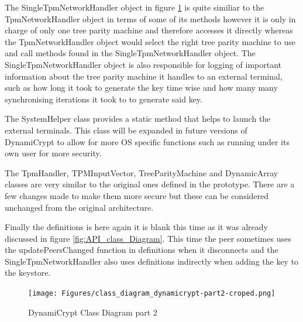 The SingleTpmNetworkHandler object in figure \ref{fig:class_diagram_dynamicrypt-part2} is quite similiar to the TpmNetworkHandler object in terms of some of its methods however it is only in charge of only one tree parity machine and therefore accesses it directly whereas the TpmNetworkHandler object would select the right tree parity machine to use and call methods found in the SingleTpmNetworkHandler object. The SingleTpmNetworkHandler object is also responsible for logging of important information about the tree parity machine it handles to an external terminal, such as how long it took to generate the key time wise and how many many synchronising iterations it took to to generate said key. 

The SystemHelper class provides a static method that helps to launch the external terminals. This class will be expanded in future versions of DynamiCrypt to allow for more OS specific functions such as running under its own user for more security. 

The TpmHandler, TPMInputVector, TreeParityMachine and DynamicArray classes are very similar to the original ones defined in the prototype. There are a few changes made to make them more secure but these can be considered unchanged from the original architecture.

Finally the definitions is here again it is blank this time as it was already discussed in figure \ref{fig:API_class_Diagram}. This time the peer sometimes uses the updatePeersChanged function in definitions when it disconnects and the SingleTpmNetworkHandler also uses definitions indirectly when adding the key to the keystore.

\begin{figure}[!h]
  \centering
      \texttt{[image: Figures/class\_diagram\_dynamicrypt-part2-croped.png]}
  \caption[DynamiCrypt Class Diagram part 2]{DynamiCrypt Class Diagram part 2}
  \label{fig:class_diagram_dynamicrypt-part2}
\end{figure}
\FloatBarrier

